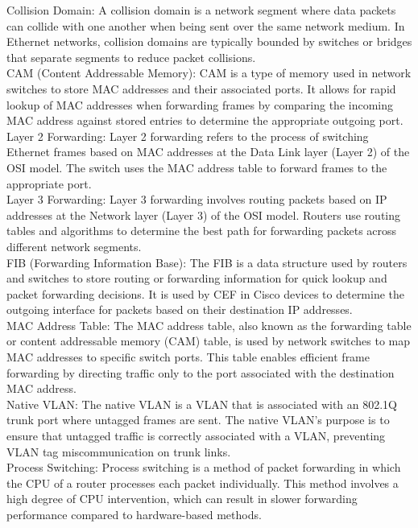 \documentclass{article}
\begin{document}
Collision Domain: A collision domain is a network segment where data packets can collide with one another when being sent over the same network medium. In Ethernet networks, collision domains are typically bounded by switches or bridges that separate segments to reduce packet collisions.\\

CAM (Content Addressable Memory): CAM is a type of memory used in network switches to store MAC addresses and their associated ports. It allows for rapid lookup of MAC addresses when forwarding frames by comparing the incoming MAC address against stored entries to determine the appropriate outgoing port.\\

Layer 2 Forwarding: Layer 2 forwarding refers to the process of switching Ethernet frames based on MAC addresses at the Data Link layer (Layer 2) of the OSI model. The switch uses the MAC address table to forward frames to the appropriate port.\\

Layer 3 Forwarding: Layer 3 forwarding involves routing packets based on IP addresses at the Network layer (Layer 3) of the OSI model. Routers use routing tables and algorithms to determine the best path for forwarding packets across different network segments.\\

FIB (Forwarding Information Base): The FIB is a data structure used by routers and switches to store routing or forwarding information for quick lookup and packet forwarding decisions. It is used by CEF in Cisco devices to determine the outgoing interface for packets based on their destination IP addresses.\\

MAC Address Table: The MAC address table, also known as the forwarding table or content addressable memory (CAM) table, is used by network switches to map MAC addresses to specific switch ports. This table enables efficient frame forwarding by directing traffic only to the port associated with the destination MAC address.\\

Native VLAN: The native VLAN is a VLAN that is associated with an 802.1Q trunk port where untagged frames are sent. The native VLAN's purpose is to ensure that untagged traffic is correctly associated with a VLAN, preventing VLAN tag miscommunication on trunk links.\\

Process Switching: Process switching is a method of packet forwarding in which the CPU of a router processes each packet individually. This method involves a high degree of CPU intervention, which can result in slower forwarding performance compared to hardware-based methods.\\
\end{document}
